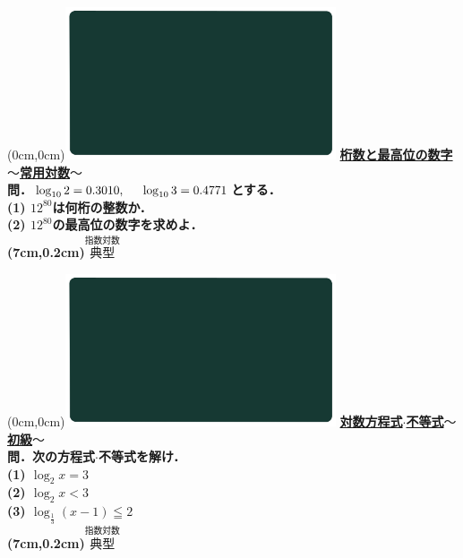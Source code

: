 \documentclass[10pt,
fleqn,
dvipdfmx,
uplatex
]{jsarticle}
\begin{document}
\at(0cm,0cm){\includegraphics[width=8cm,bb=0 0 1920 1080]{./media_local/smart_background/指数対数.jpeg}}
{\color{orange}\bf\boldmath\large\underline{桁数と最高位の数字$〜$常用対数$〜$}}\vspace{0.3zw}\\
\Large 
\bf\boldmath 問．$\log _{10}2=0.{3010},\;\\\ \ \ \ \log _{10}3=0.{4771}$とする．\vspace{0.3zw}\\
(1)  ${12}^{80}$は何桁の整数か．\\
(2)  ${12}^{80}$の最高位の数字を求めよ．\\

\at(7cm,0.2cm){\small\color{bradorange}$\overset{\text{指数対数}}{\text{典型}}$}


\newpage



\at(0cm,0cm){\includegraphics[width=8cm,bb=0 0 1920 1080]{./media_local/smart_background/指数対数.jpeg}}
{\color{orange}\bf\boldmath\Large\underline{対数方程式$\cdot$不等式$〜$初級$〜$}}\vspace{0.3zw}\\
\Large 
\bf\boldmath 問．次の方程式$\cdot$不等式を解け．\vspace{0.3zw}\\
(1)  $\log _2x=3$\\
(2)  $\log _2x<3$\\
(3)  $\log _{\frac{1}{3}}\left(x-1\right)\leqq 2$\\

\at(7cm,0.2cm){\small\color{bradorange}$\overset{\text{指数対数}}{\text{典型}}$}
\end{document}
